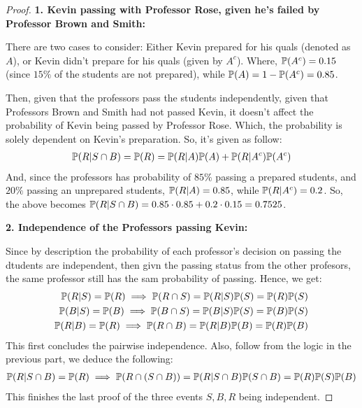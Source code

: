 \documentclass{article}
\begin{document}
\begin{proof}

    \hfil

    \textbf{1. Kevin passing with Professor Rose, given he's failed by Professor Brown and Smith:}

    There are two cases to consider: Either Kevin prepared for his quals (denoted as $A$), or Kevin didn't prepare for his quals (given by $A^c$). Where, $\mathbb{P}(A^c)=0.15$ (since $15\%$ of the students are not prepared), while $\mathbb{P}(A)=1-\mathbb{P}(A^c)=0.85$.

    Then, given that the professors pass the students independently, given that Professors Brown and Smith had not passed Kevin, it doesn't affect the probability of Kevin being passed by Professor Rose. Which, the probability is solely dependent on Kevin's preparation. So, it's given as follow:
    \begin{align}
        \mathbb{P}(R|S\cap B)=\mathbb{P}(R)=\mathbb{P}(R|A)\mathbb{P}(A) + \mathbb{P}(R|A^c)\mathbb{P}(A^c)
    \end{align}
    And, since the professors has probability of $85\%$ passing a prepared students, and $20\%$ passing an unprepared students, $\mathbb{P}(R|A)=0.85$, while $\mathbb{P}(R|A^c)=0.2$. So, the above becomes $\mathbb{P}(R|S\cap B)=0.85\cdot 0.85+0.2\cdot 0.15 = 0.7525$.
    
    \hfil

    \textbf{2. Independence of the Professors passing Kevin:}

    Since by description the probability of each professor's decision on passing the dtudents are independent, then givn the passing status from the other profesors, the same professor still has the sam probability of passing. Hence, we get:
    \begin{align}
        \mathbb{P}(R|S) = \mathbb{P}(R)\implies \mathbb{P}(R\cap S)=\mathbb{P}(R|S)\mathbb{P}(S)=\mathbb{P}(R)\mathbb{P}(S)\\
        \mathbb{P}(B|S) = \mathbb{P}(B)\implies \mathbb{P}(B\cap S)=\mathbb{P}(B|S)\mathbb{P}(S)=\mathbb{P}(B)\mathbb{P}(S)\\
        \mathbb{P}(R|B) = \mathbb{P}(R)\implies \mathbb{P}(R\cap B)=\mathbb{P}(R|B)\mathbb{P}(B)=\mathbb{P}(R)\mathbb{P}(B)
    \end{align}
    This first concludes the pairwise independence. Also, follow from the logic in the previous part, we deduce the following:
    \begin{align}
        \mathbb{P}(R|S\cap B)=\mathbb{P}(R)\implies \mathbb{P}(R\cap (S\cap B))=\mathbb{P}(R|S\cap B)\mathbb{P}(S\cap B)= \mathbb{P}(R)\mathbb{P}(S)\mathbb{P}(B)
    \end{align}
    This finishes the last proof of the three events $S,B,R$ being independent.


\end{proof}
\end{document}
